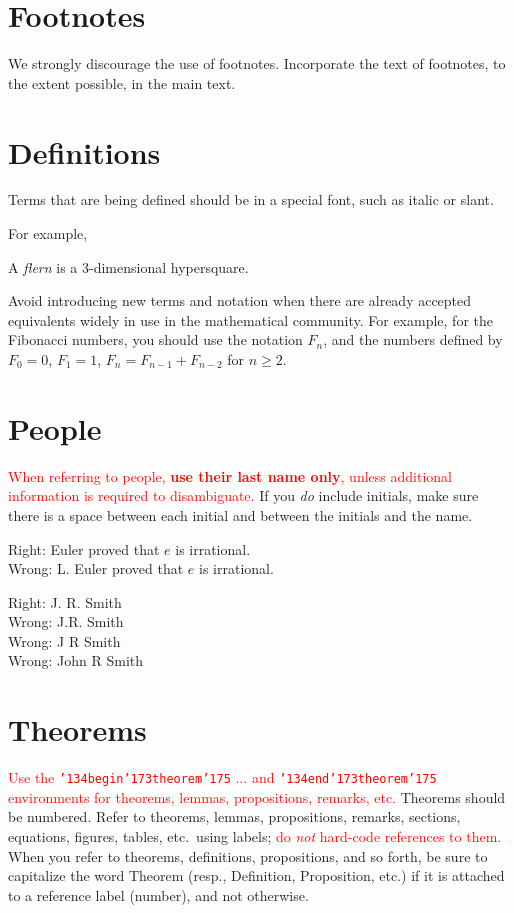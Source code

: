 \documentclass[12pt]{article}
\begin{document}
\section{Footnotes}

We strongly
discourage the use of footnotes.  Incorporate the text of footnotes, to the
extent possible, in the main text.

\section{Definitions}

Terms that are being defined should be in a special font, such as italic
or slant. 

For example,

\centerline{A {\it flern} is a 3-dimensional hypersquare.}

Avoid introducing new terms and notation when there are already accepted
equivalents widely in use in the mathematical community.
For example, for the Fibonacci numbers, you
should use the notation $F_n$, and the numbers defined by
$F_0 = 0$, $F_1 = 1$, $F_n = F_{n-1} + F_{n-2}$ for $n \geq 2$.

\section{People}

\textcolor{red}{When referring to people, \textbf{use their last name only}, unless additional
information is required to disambiguate.}  If you {\it do\/} include initials,
make sure there is a space between each initial and between the initials
and the name.  

\medskip

\noindent Right:  Euler proved that $e$ is irrational. \\
\noindent Wrong:  L. Euler proved that $e$ is irrational.

\medskip

\noindent Right:  J. R. Smith \\
\noindent Wrong:  J.R. Smith \\
\noindent Wrong:  J R Smith \\
\noindent Wrong:  John R Smith

\section{Theorems}

\textcolor{red}{Use the {\tt \char'134begin\char'173theorem\char'175} $\ldots$
and {\tt \char'134end\char'173theorem\char'175} environments for theorems,
lemmas, propositions, remarks,
etc.}  Theorems should be numbered.  Refer to theorems,
lemmas, propositions, remarks, sections, equations, figures, tables, etc.\ using
labels; \textcolor{red}{do {\it not} hard-code references to them.}  When you
refer to theorems, definitions, propositions, and so forth, be sure
to capitalize the word Theorem (resp., Definition, Proposition, etc.) if
it is attached to a reference label (number), and not otherwise.
\end{document}
